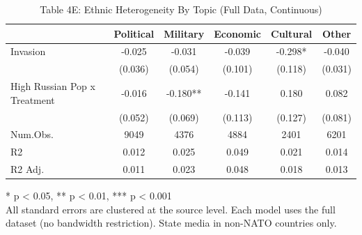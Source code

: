 \begin{table}[!t]
\caption{Table 4E: Ethnic Heterogeneity By Topic (Full Data, Continuous)} 
\fontsize{12.0pt}{14.4pt}\selectfont
\begin{tabular*}{\linewidth}{@{\extracolsep{\fill}}lccccc}
\toprule
  & Political & Military & Economic & Cultural & Other \\ 
\midrule\addlinespace[2.5pt]
Invasion & -0.025 & -0.031 & -0.039 & -0.298* & -0.040 \\ 
 & (0.036) & (0.054) & (0.101) & (0.118) & (0.031) \\ 
High Russian Pop x Treatment & -0.016 & -0.180** & -0.141 & 0.180 & 0.082 \\ 
{} & {(0.052)} & {(0.069)} & {(0.113)} & {(0.127)} & {(0.081)} \\ 
Num.Obs. & 9049 & 4376 & 4884 & 2401 & 6201 \\ 
R2 & 0.012 & 0.025 & 0.049 & 0.021 & 0.014 \\ 
R2 Adj. & 0.011 & 0.023 & 0.048 & 0.018 & 0.013 \\ 
\bottomrule
\end{tabular*}
\begin{minipage}{\linewidth}
* p < 0.05, ** p < 0.01, *** p < 0.001\\
All standard errors are clustered at the source level. Each model uses the full
dataset (no bandwidth restriction). State media in non-NATO countries only.\\
\end{minipage}
\end{table}

